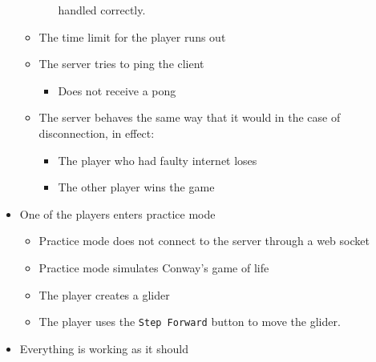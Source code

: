 \documentclass[11pt]{article}
\begin{document}
\begin{itemize}
\begin{itemize}
\begin{itemize}
handled correctly.
\end{itemize}
\item The time limit for the player runs out
\item The server tries to ping the client
\begin{itemize}
\item Does not receive a pong
\end{itemize}
\item The server behaves the same way that it would in the case of disconnection, in effect:
\begin{itemize}
\item The player who had faulty internet loses
\item The other player wins the game
\end{itemize}
\end{itemize}
\item One of the players enters practice mode
\begin{itemize}
\item Practice mode does not connect to the server through a web socket
\item Practice mode simulates Conway's game of life
\item The player creates a glider
\item The player uses the \texttt{Step Forward} button to move the glider.
\end{itemize}
\item Everything is working as it should
\end{itemize}
\end{document}
